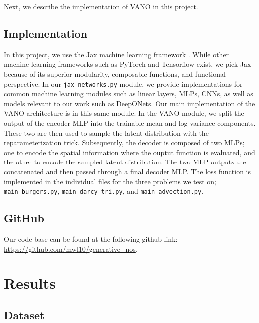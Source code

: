 \documentclass[11pt, fullpage,letterpaper]{article}
\begin{document}
Next, we describe the implementation of VANO in this project.

\subsection{Implementation}


In this project, we use the Jax machine learning framework \cite{jax}. While other machine learning frameworks such as PyTorch and Tensorflow exist, we pick Jax because of its superior modularity, composable functions, and functional perspective. In our \texttt{jax\_networks.py} module, we provide implementations for common machine learning modules such as linear layers, MLPs, CNNs, as well as models relevant to our work such as DeepONets. Our main implementation of the VANO architecture is in this same module. In the VANO module, we split the output of the encoder MLP into the trainable mean and log-variance components. These two are then used to sample the latent distribution with the reparameterization trick. Subsequently, the decoder is composed of two MLPs; one to encode the spatial information where the ouptut function is evaluated, and the other to encode the sampled latent distribution. The two MLP outputs are concatenated and then passed through a final decoder MLP. The loss function is implemented in the individual files for the three problems we test on; \texttt{main\_burgers.py}, \texttt{main\_darcy\_tri.py}, and \texttt{main\_advection.py}.

\subsection{GitHub}
Our code base can be found at the following github link: \url{https://github.com/mwl10/generative_nos}. 

\section{Results}

\subsection{Dataset}
\label{sec:dataset}
\end{document}
